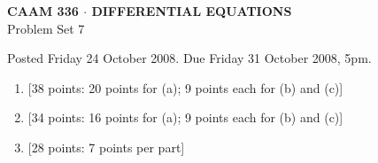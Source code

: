 \documentclass[10pt]{article}
\begin{document}
\begin{center}
\large \textsf{\textbf{CAAM 336 $\cdot$ DIFFERENTIAL EQUATIONS}\\[0.5em]
 Problem Set 7 }
\end{center}

Posted Friday 24 October 2008.  Due Friday 31 October 2008, 5pm.

\begin{enumerate}
\item {[38 points: 20 points for (a); 9 points each for (b) and (c)]}\\  

\vspace*{1em}
\item {[34 points: 16 points for (a); 9 points each for (b) and (c)]}\\  

\vspace*{1em}
\item {[28 points: 7 points per part]} \\  

\end{enumerate}
\end{document}
